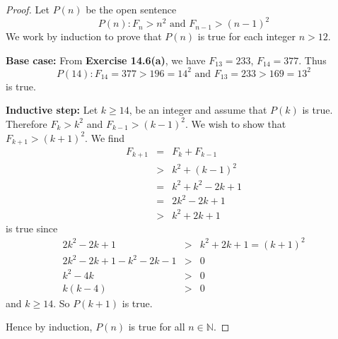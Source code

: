 \documentclass[12pt,oneside]{article}
\newcommand{\N}{\mathbb{N}}
\begin{document}
\begin{proof}
Let $P(n)$ be the open sentence
\[P(n): F_n > n^2 \text{ and } F_{n-1} > (n-1)^2\]
We work by induction to prove that $P(n)$ is true for each integer $n > 12$.

\textbf{Base case:} From \textbf{Exercise 14.6(a)}, we have $F_{13} = 233$, $F_{14} = 377$. Thus 
\[P(14): F_{14} = 377 > 196 = 14^2 \text{ and } F_{13} = 233 > 169 = 13^2\]
is true.

\textbf{Inductive step:} Let $k \geq 14$, be an integer and assume that $P(k)$ is true. Therefore $F_k > k^2$ and $F_{k-1} > (k-1)^2$. We wish to show that $F_{k+1} > (k+1)^2$. We find
\begin{eqnarray*}
F_{k+1} &=& F_k + F_{k-1} \\
&>& k^2 + (k-1)^2 \\
&=& k^2 + k^2 - 2k + 1 \\
&=& 2k^2 - 2k + 1 \\
&>& k^2 + 2k + 1
\end{eqnarray*}
is true since
\begin{eqnarray*}
2k^2 - 2k + 1 &>& k^2 + 2k + 1 = (k+1)^2 \\
2k^2 - 2k + 1 - k^2 - 2k - 1&>& 0 \\
k^2 - 4k &>& 0 \\
k(k - 4) &>& 0
\end{eqnarray*}
and $k \geq 14$. So $P(k+1)$ is true.

Hence by induction, $P(n)$ is true for all $n \in \N$.
\end{proof}


\end{document}
